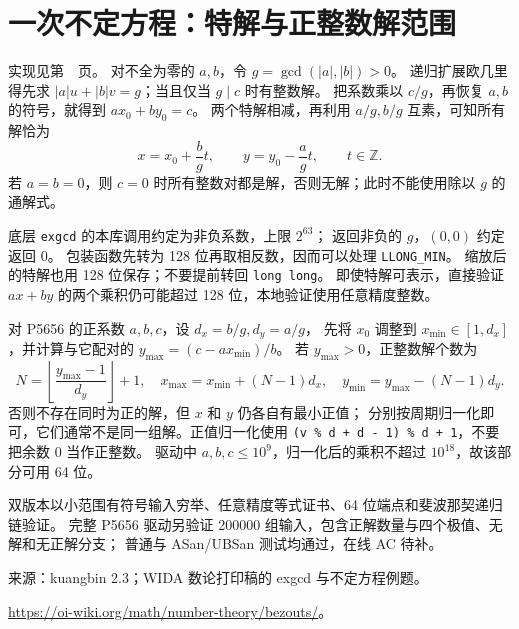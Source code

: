 \section{一次不定方程：特解与正整数解范围}
实现见第~\pageref{compact-linear_equation}~页。
对不全为零的 $a,b$，令 $g=\gcd(|a|,|b|)>0$。
递归扩展欧几里得先求 $|a|u+|b|v=g$；当且仅当 $g\mid c$ 时有整数解。
把系数乘以 $c/g$，再恢复 $a,b$ 的符号，就得到 $ax_0+by_0=c$。
两个特解相减，再利用 $a/g,b/g$ 互素，可知所有解恰为
\[
x=x_0+\frac bg t,\qquad y=y_0-\frac ag t,\qquad t\in\mathbb Z.
\]
若 $a=b=0$，则 $c=0$ 时所有整数对都是解，否则无解；此时不能使用除以 $g$ 的通解式。

底层 \texttt{exgcd} 的本库调用约定为非负系数，上限 $2^{63}$；
返回非负的 $g$，$(0,0)$ 约定返回 0。
包装函数先转为 128 位再取相反数，因而可以处理 \texttt{LLONG\_MIN}。
缩放后的特解也用 128 位保存；不要提前转回 \texttt{long long}。
即使特解可表示，直接验证 $ax+by$ 的两个乘积仍可能超过 128 位，本地验证使用任意精度整数。

对 P5656 的正系数 $a,b,c$，设 $d_x=b/g,d_y=a/g$，
先将 $x_0$ 调整到 $x_{\min}\in[1,d_x]$，并计算与它配对的
$y_{\max}=(c-ax_{\min})/b$。
若 $y_{\max}>0$，正整数解个数为
\[
N=\left\lfloor\frac{y_{\max}-1}{d_y}\right\rfloor+1,
\quad x_{\max}=x_{\min}+(N-1)d_x,
\quad y_{\min}=y_{\max}-(N-1)d_y.
\]
否则不存在同时为正的解，但 $x$ 和 $y$ 仍各自有最小正值；
分别按周期归一化即可，它们通常不是同一组解。正值归一化使用
\texttt{(v \% d + d - 1) \% d + 1}，不要把余数 0 当作正整数。
驱动中 $a,b,c\le10^9$，归一化后的乘积不超过 $10^{18}$，故该部分可用 64 位。

双版本以小范围有符号输入穷举、任意精度等式证书、64 位端点和斐波那契递归链验证。
完整 P5656 驱动另验证 200000 组输入，包含正解数量与四个极值、无解和无正解分支；
普通与 ASan/UBSan 测试均通过，在线 AC 待补。

来源：kuangbin 2.3；WIDA 数论打印稿的 exgcd 与不定方程例题。

\url{https://oi-wiki.org/math/number-theory/bezouts/}。

